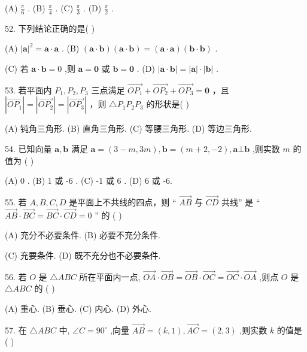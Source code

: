 \documentclass[10pt]{article}
\begin{document}
(A) \(\frac{\pi }{6}\) . (B) \(\frac{\pi }{4}\) . (C) \(\frac{\pi }{3}\) . (D) \(\frac{\pi }{2}\) .

52. 下列结论正确的是( )

(A) \({\left| \mathbf{a}\right| }^{2} = \mathbf{a} \cdot  \mathbf{a}\) . (B) \(\left( {\mathbf{a} \cdot  \mathbf{b}}\right) \left( {\mathbf{a} \cdot  \mathbf{b}}\right)  = \left( {\mathbf{a} \cdot  \mathbf{a}}\right) \left( {\mathbf{b} \cdot  \mathbf{b}}\right)\) .

(C) 若 \(\mathbf{a} \cdot  \mathbf{b} = 0\) ,则 \(\mathbf{a} = \mathbf{0}\) 或 \(\mathbf{b} = \mathbf{0}\) . (D) \(\left| {\mathbf{a} \cdot  \mathbf{b}}\right|  = \left| \mathbf{a}\right|  \cdot  \left| \mathbf{b}\right|\) .

53. 若平面内 \({P}_{1},{P}_{2},{P}_{3}\) 三点满足 \(\overrightarrow{O{P}_{1}} + \overrightarrow{O{P}_{2}} + \overrightarrow{O{P}_{3}} = \mathbf{0}\) ，且 \(\left| \overrightarrow{O{P}_{1}}\right|  = \left| \overrightarrow{O{P}_{2}}\right|  = \left| \overrightarrow{O{P}_{3}}\right|\) ，则 \(\bigtriangleup  {P}_{1}{P}_{2}{P}_{3}\) 的形状是( )

(A) 钝角三角形. (B) 直角三角形. (C) 等腰三角形. (D) 等边三角形.

54. 已知向量 \(\mathbf{a},\mathbf{b}\) 满足 \(\mathbf{a} = \left( {3 - m,{3m}}\right) ,\mathbf{b} = \left( {m + 2, - 2}\right) ,\mathbf{a} \bot  \mathbf{b}\) ,则实数 \(m\) 的值为 ( )

(A) 0 . (B) 1 或 -6 . (C) -1 或 6 . (D) 6 或 -6.

55. 若 \(A,B,C,D\) 是平面上不共线的四点，则 “ \(\overrightarrow{AB}\) 与 \(\overrightarrow{CD}\) 共线” 是 “ \(\overrightarrow{AB} \cdot  \overrightarrow{BC} = \overrightarrow{BC} \cdot  \overrightarrow{CD} = 0\) ” 的 ( )

(A) 充分不必要条件. (B) 必要不充分条件.

(C) 充要条件. (D) 既不充分也不必要条件.

56. 若 \(O\) 是 \(\bigtriangleup {ABC}\) 所在平面内一点, \(\overrightarrow{OA} \cdot  \overrightarrow{OB} = \overrightarrow{OB} \cdot  \overrightarrow{OC} = \overrightarrow{OC} \cdot  \overrightarrow{OA}\) ,则点 \(O\) 是 \(\bigtriangleup {ABC}\) 的 ( )

(A) 重心. (B) 垂心. (C) 内心. (D) 外心.

57. 在 \(\bigtriangleup {ABC}\) 中, \(\angle C = {90}^{ \circ  }\) ,向量 \(\overrightarrow{AB} = \left( {k,1}\right) ,\overrightarrow{AC} = \left( {2,3}\right)\) ,则实数 \(k\) 的值是 ( )
\end{document}
